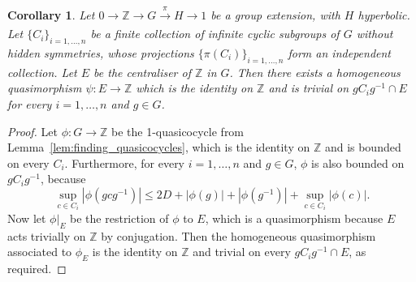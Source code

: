 \documentclass[svgnames]{amsart}
\theoremstyle{plain}
\newtheorem{cor}[thm]{Corollary}
\theoremstyle{definition}
\newcommand{\Z}{\mathbb{Z}}
\begin{document}
\begin{cor}\label{cor:finding_quasimorphisms}
    Let $0\to \Z\to G\xrightarrow[]{\pi} H\to 1$ be a group extension, with $H$ hyperbolic. Let $\{C_i\}_{i=1,\ldots, n}$ be a finite collection of infinite cyclic subgroups of $G$ without hidden symmetries, whose projections $\{\pi(C_i)\}_{i=1,\ldots, n}$ form an independent collection. Let $E$ be the centraliser of $\Z$ in $G$. Then there exists a homogeneous quasimorphism $\psi\colon E\to \Z$ which is the identity on $\Z$ and is trivial on $gC_i g^{-1}\cap E$ for every ${i=1,\ldots, n}$ and $g\in G$.
\end{cor}

\begin{proof}
    Let $\phi\colon G\to \Z$ be the 1-quasicocycle from Lemma~\ref{lem:finding_quasicocycles}, which is the identity on $\Z$ and is bounded on every $C_i$. Furthermore, for every ${i=1,\ldots, n}$ and $g\in G$, $\phi$ is also bounded on $gC_i g^{-1}$, because
    $$\sup_{c\in C_i}|\phi(gcg^{-1})|\le 2D+|\phi(g)|+|\phi(g^{-1})|+ \sup_{c\in C_i}|\phi(c)|.$$
    Now let $\phi|_E$ be the restriction of $\phi$ to $E$, which is a quasimorphism because $E$ acts trivially on $\Z$ by conjugation. Then the homogeneous quasimorphism associated to $\phi_E$ is the identity on $\Z$ and trivial on every $gC_i g^{-1}\cap E$, as required.
\end{proof}
\end{document}
